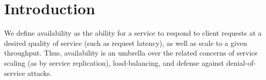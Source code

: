 \section{Introduction}
\label{sec:intro}

We define availability as the ability for a service to respond to
client requests at a desired quality of service (such as request latency),
as well as scale to a given throughput.
%
Thus, availability is an umbrella over the related concerns of
service scaling (as by service replication), load-balancing, and defense
against denial-of-service attacks.
%
